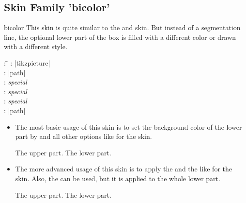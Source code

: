 \subsection{Skin Family 'bicolor'}
\begin{docSkin}{bicolor}
  This skin is quite similar to the  and  skin.
  But instead of a segmentation line, the optional lower part of the box is filled with a
  different color or drawn with a different style.
\begin{tcolorbox}[skintable=bicolor]
  \begin{tabbing}
    : \=\kill
    :  \> |tikzpicture|\\ 
    :           \> |path|\\
    : \> \emph{special}\\ 
    :        \> \emph{special}\\
    :    \> \emph{special}\\
    :           \> |path|
  \end{tabbing}
\end{tcolorbox}
  \begin{itemize}
  \item The most basic usage of this skin is to set the background color of
    the lower part by  and all other options like for
    the  skin.
\begin{dispExample}
\begin{tcolorbox}[skin=bicolor,title=The title,
    colframe=FireBrick!75!black,colback=Salmon!50!white,colbacklower=Salmon]
  The upper part.
  \tcblower
  The lower part.
\end{tcolorbox}
\end{dispExample}
  \item The more advanced usage of this skin is to apply the 
    and the  like for
    the  skin. Also, the  can be
    used, but it is applied to the whole lower part.
\begin{dispExample}
\begin{tcolorbox}[skin=bicolor,title=The title,
    frame style={top color=FireBrick,
                 bottom color=FireBrick!15!white,draw=black},
    interior style={left color=Salmon,right color=Salmon!50!white},
    segmentation style={right color=Salmon,left color=Salmon!50!white}]
  The upper part.
  \tcblower
  The lower part.
\end{tcolorbox}
\end{dispExample}
  \end{itemize}
\end{docSkin}

